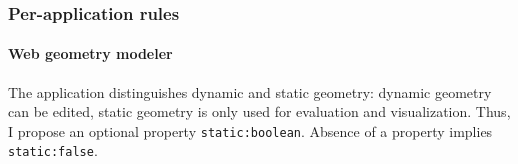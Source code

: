 \subsubsection{Per-application rules}
\label{sec:services:appru}

\paragraph{Web geometry modeler}
The application distinguishes dynamic and static geometry:
dynamic geometry can be edited, static geometry is only used for evaluation and visualization.
Thus, I propose an optional property \texttt{static:\color{blue}boolean}.
Absence of a property implies \texttt{static:\color{brown}false}.
